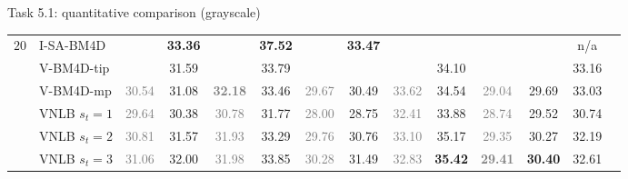 \documentclass[mathserif, 8pt]{beamer}
\newcommand{\bsic}[1]{\textcolor{gray}{#1}}
\newcommand{\Bsic}[1]{\textcolor{gray}{\textbf{#1}}}
\newcommand{\Best}[1]{\textbf{\textcolor{MyOrangeBrighter}{#1}}}
\begin{document}
\begin{frame}{Task 5.1: quantitative comparison (grayscale)}
\begin{center}
{\begin{tabular}{ c | l |c c | c c | c c | c c | c c | c c}
%                                                                                                                                                                                                                      
			\multirow{1}{*}{$20$}                                                                                                                                                                                         
			                      & I-SA-BM4D            & \bsic{     } & \Best{33.36} & \bsic{     } & \Best{37.52}  & \bsic{     } & \Best{33.47} &              &               &              &              &  n/a  \\
			                      & V-BM4D-tip           & \bsic{     } &       31.59  & \bsic{     } &       33.79   &              &              &              &       34.10   &              &              &  33.16  \\
			                      & V-BM4D-mp            & \bsic{30.54} &       31.08  & \Bsic{32.18} &       33.46   & \bsic{29.67} &       30.49  & \bsic{33.62} &       34.54   & \bsic{29.04} &       29.69  &  33.03  \\
			                      & VNLB   $s_t = 1$     & \bsic{29.64} &       30.38  & \bsic{30.78} &       31.77   & \bsic{28.00} &       28.75  & \bsic{32.41} &       33.88   & \bsic{28.74} &       29.52  &       30.74  \\
			                      & VNLB   $s_t = 2$     & \bsic{30.81} &       31.57  & \bsic{31.93} &       33.29   & \bsic{29.76} &       30.76  & \bsic{33.10} &       35.17   & \bsic{29.35} &       30.27  &       32.19  \\
			                      & VNLB   $s_t = 3$     & \bsic{31.06} &       32.00  & \bsic{31.98} &       33.85   & \bsic{30.28} &       31.49  & \bsic{32.83} & \Best{35.42}  & \Bsic{29.41} & \Best{30.40} &      {32.61} \\

\end{tabular}}
\end{center}
\end{frame}
\end{document}
